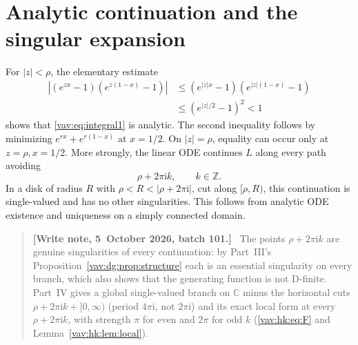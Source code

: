 \documentclass[11pt]{article}
\theoremstyle{remark}\newtheorem{remark}[theorem]{Remark}
\newcommand{\ii}{\mathrm i}
\newenvironment{writenoteb}{\begin{quote}\small\raggedright\textbf{[Write note, 5~October 2026, batch 101.]}\ }{\end{quote}}
\begin{document}
\section{Analytic continuation and the singular expansion}\label{vav:sec:continuation}

For $|z|<\rho$, the elementary estimate
\begin{align*}
 |(e^{zx}-1)(e^{z(1-x)}-1)|
 &\le(e^{|z|x}-1)(e^{|z|(1-x)}-1)\\
 &\le(e^{|z|/2}-1)^2<1
\end{align*}
shows that \eqref{vav:eq:integral1} is analytic. The second inequality
follows by minimizing $e^{rx}+e^{r(1-x)}$ at $x=1/2$.
On $|z|=\rho$, equality can occur only at $z=\rho,x=1/2$.
More strongly, the linear ODE continues $L$ along every path avoiding
\[
 \rho+2\pi\ii k,\qquad k\in\mathbb Z.
\]
In a disk of radius $R$ with $\rho<R<|\rho+2\pi\ii|$, cut along
$[\rho,R)$, this continuation is single-valued and has no other
singularities. This follows from analytic ODE existence and uniqueness
on a simply connected domain.
\begin{writenoteb}
The points $\rho+2\pi\ii k$ are genuine singularities of every
continuation: by Part~III's Proposition~\ref{vav:dg:prop:structure} each is
an essential singularity on every branch, which also shows that the
generating function is not D-finite. Part~IV gives a global single-valued
branch on $\mathbb C$ minus the horizontal cuts $\rho+2\pi\ii k+[0,\infty)$
(period $4\pi\ii$, not $2\pi\ii$) and its exact local form at every
$\rho+2\pi\ii k$, with strength $\pi$ for even and $2\pi$ for odd $k$
(\eqref{vav:hk:eq:F} and Lemma~\ref{vav:hk:lem:local}).
\end{writenoteb}
\end{document}
